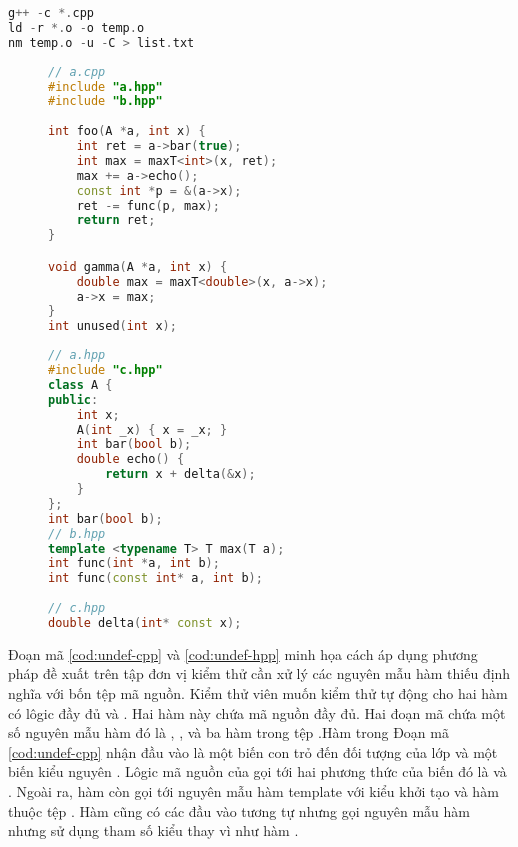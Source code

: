 \begin{lstlisting}[language=C++, caption={Các câu lệnh tìm nguyên mẫu hàm thiếu định nghĩa cần quan tâm sử dụng trình biên dịch.}, label={cod:command-undef},  captionpos=b]
g++ -c *.cpp
ld -r *.o -o temp.o
nm temp.o -u -C > list.txt
\end{lstlisting}

\begin{figure}[t]
    \begin{minipage}[t]{0.5\linewidth}
    \begin{lstlisting}[language=C++, caption={Mã nguồn tệp a.cpp.}, label={cod:undef-cpp}, captionpos=b]
// a.cpp
#include "a.hpp"
#include "b.hpp"
    
int foo(A *a, int x) {
    int ret = a->bar(true);
    int max = maxT<int>(x, ret);
    max += a->echo();
    const int *p = &(a->x);
    ret -= func(p, max);
    return ret;
}

void gamma(A *a, int x) {
    double max = maxT<double>(x, a->x);
    a->x = max;
}
int unused(int x);
    \end{lstlisting}
    \end{minipage}
    \begin{minipage}[t]{0.5\linewidth}
    \begin{lstlisting}[language=C++, caption={Mã nguồn tệp a.hpp, b.hpp và c.hpp.}, label={cod:undef-hpp}, captionpos=b]
// a.hpp
#include "c.hpp"
class A {
public: 
    int x;
    A(int _x) { x = _x; }
    int bar(bool b);
    double echo() {
        return x + delta(&x);
    }
};
int bar(bool b);
// b.hpp
template <typename T> T max(T a);
int func(int *a, int b);
int func(const int* a, int b);
    
// c.hpp
double delta(int* const x);  
    \end{lstlisting}
\end{minipage}
\end{figure}

Đoạn mã \ref{cod:undef-cpp} và \ref{cod:undef-hpp} minh họa cách áp dụng phương pháp đề xuất trên tập đơn vị kiểm thử cần xử lý các nguyên mẫu hàm thiếu định nghĩa với bốn tệp mã nguồn. Kiểm thử viên muốn kiểm thử tự động cho hai hàm có lôgic đầy đủ  và . Hai hàm này chứa mã nguồn đầy đủ. Hai đoạn mã chứa một số nguyên mẫu hàm đó là , ,  và ba hàm trong tệp .Hàm  trong Đoạn mã \ref{cod:undef-cpp} nhận đầu vào là một biến con trỏ đến đối tượng của lớp  và một biến kiểu nguyên . Lôgic mã nguồn của  gọi tới hai phương thức của biến  đó là  và . Ngoài ra, hàm  còn gọi tới nguyên mẫu hàm template  với kiểu khởi tạo  và hàm  thuộc tệp . Hàm  cũng có các đầu vào tương tự nhưng gọi nguyên mẫu hàm  nhưng sử dụng tham số kiểu  thay vì  như hàm .

